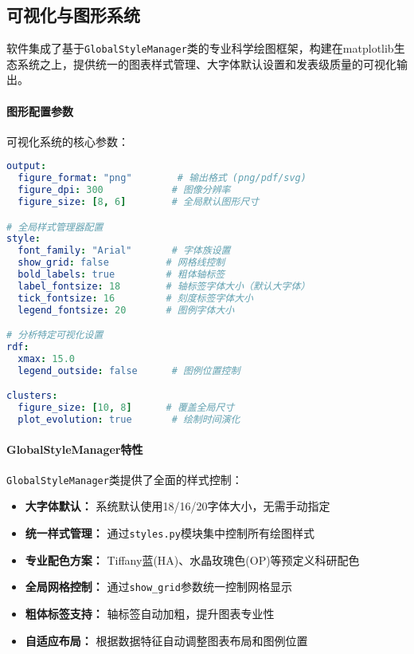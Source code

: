 \subsection{可视化与图形系统}
\label{subsec:visualization_system}

软件集成了基于\lstinline|GlobalStyleManager|类的专业科学绘图框架，构建在matplotlib生态系统之上，提供统一的图表样式管理、大字体默认设置和发表级质量的可视化输出。

\paragraph{图形配置参数}

可视化系统的核心参数：

\begin{lstlisting}[language=yaml,style=blockstyle]
output:
  figure_format: "png"        # 输出格式 (png/pdf/svg)
  figure_dpi: 300            # 图像分辨率
  figure_size: [8, 6]        # 全局默认图形尺寸

# 全局样式管理器配置
style:
  font_family: "Arial"       # 字体族设置
  show_grid: false          # 网格线控制
  bold_labels: true         # 粗体轴标签
  label_fontsize: 18        # 轴标签字体大小（默认大字体）
  tick_fontsize: 16         # 刻度标签字体大小
  legend_fontsize: 20       # 图例字体大小

# 分析特定可视化设置
rdf:
  xmax: 15.0
  legend_outside: false      # 图例位置控制

clusters:
  figure_size: [10, 8]      # 覆盖全局尺寸
  plot_evolution: true       # 绘制时间演化
\end{lstlisting}

\paragraph{GlobalStyleManager特性}

\lstinline|GlobalStyleManager|类提供了全面的样式控制：

\begin{itemize}
    \item \textbf{大字体默认：} 系统默认使用18/16/20字体大小，无需手动指定
    \item \textbf{统一样式管理：} 通过\lstinline|styles.py|模块集中控制所有绘图样式
    \item \textbf{专业配色方案：} Tiffany蓝(HA)、水晶玫瑰色(OP)等预定义科研配色
    \item \textbf{全局网格控制：} 通过\lstinline|show_grid|参数统一控制网格显示
    \item \textbf{粗体标签支持：} 轴标签自动加粗，提升图表专业性
    \item \textbf{自适应布局：} 根据数据特征自动调整图表布局和图例位置
\end{itemize}

